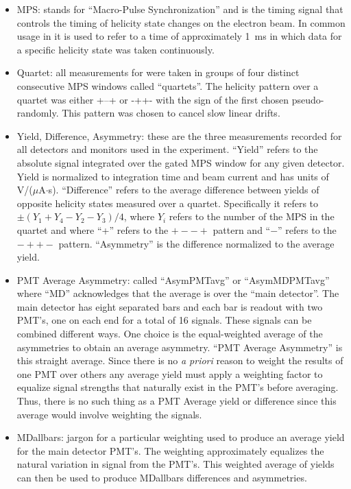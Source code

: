 \begin{itemize}
\item{MPS: stands for ``Macro-Pulse Synchronization'' and is the timing signal that controls the timing of helicity state changes on the electron beam. In common usage in \Qs it is used to refer to a time of approximately 1~ms in which data for a specific helicity state was taken continuously.}
\item{Quartet: all measurements for \Qs were taken in groups of four distinct consecutive MPS windows called ``quartets''. The helicity pattern over a quartet was either +--+ or -++- with the sign of the first chosen pseudo-randomly. This pattern was chosen to cancel slow linear drifts.}
\item{Yield, Difference, Asymmetry: these are the three measurements recorded for all detectors and monitors used in the \Qs experiment. ``Yield'' refers to the absolute signal integrated over the gated MPS window for any given detector. Yield is normalized to integration time and beam current and has units of V/($\mu$A$\cdot$s). ``Difference'' refers to the average difference between yields of opposite helicity states measured over a quartet. Specifically it refers to $\pm(Y_1+Y_4-Y_2-Y_3)/4$, where $Y_i$ refers to the number of the MPS in the quartet and where ``+'' refers to the $+--+$ pattern and ``$-$'' refers to the $-++-$ pattern. ``Asymmetry'' is the difference normalized to the average yield.}
\item{PMT Average Asymmetry: called ``AsymPMTavg'' or ``AsymMD\textunderscore PMTavg'' where ``MD'' acknowledges that the average is over the ``main detector''. The main detector has eight separated bars and each bar is readout with two PMT's, one on each end for a total of 16 signals. These signals can be combined different ways. One choice is the equal-weighted average of the asymmetries to obtain an average asymmetry. ``PMT Average Asymmetry'' is this straight average. Since there is no {\it a priori} reason to weight the results of one PMT over others any average yield must apply a weighting factor to equalize signal strengths that naturally exist in the PMT's before averaging. Thus, there is no such thing as a PMT Average yield or difference since this average would involve weighting the signals.}
\item{MDallbars: \Qs jargon for a particular weighting used to produce an average yield for the main detector PMT's. The weighting approximately equalizes the natural variation in signal from the PMT's. This weighted average of yields can then be used to produce MDallbars differences and asymmetries.}
\end{itemize}
